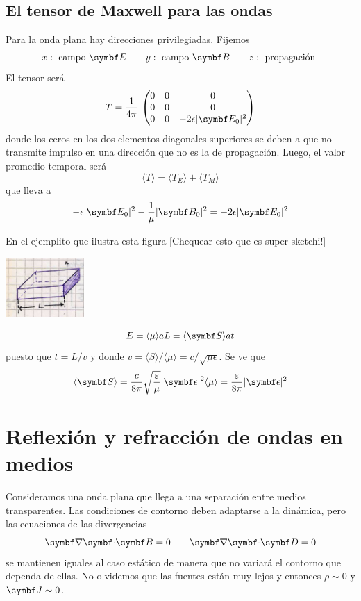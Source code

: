 \documentclass[10pt,oneside]{CBFT_book}
\begin{document}
\subsection{El tensor de Maxwell para las ondas}

Para la onda plana hay direcciones privilegiadas. Fijemos
\[
	x : \text{ campo } \vb{E} \qquad 
	y : \text{ campo } \vb{B} \qquad 
	z : \text{ propagación }
\]
El tensor será
\[
	T = \frac{1}{4\pi} \: \begin{pmatrix}
	        0	& 0 	& 0 \\
		0	& 0	& 0 \\
		0	& 0	& -2\epsilon|\vb{E}_0|^2
	       \end{pmatrix}
\]
donde los ceros en los dos elementos diagonales superiores se deben a que no transmite impulso en una
dirección que no es la de propagación. 
Luego, el valor promedio temporal será
\[
	\langle T \rangle =  \langle T_E \rangle + \langle T_M \rangle
\]
que lleva a
\[
	- \epsilon|\vb{E}_0|^2  - \frac{1}{\mu} |\vb{B}_0|^2 = -2\epsilon|\vb{E}_0|^2
\]

En el ejemplito que ilustra esta figura [Chequear esto que es super sketchi!]

\includegraphics[width=0.225\textwidth]{images/fig_ft1_paraTensorOndasMax.jpg}
	
\[
	E = \langle \mu \rangle a L = \langle \vb{S} \rangle a t
\]
puesto que $t=L/v$ y donde $v = \langle S \rangle / \langle \mu \rangle  = c / \sqrt{\mu \epsilon}$.
Se ve que 
\[
	\langle \vb{S} \rangle =  \frac{c}{8\pi} \sqrt{ \frac{\varepsilon}{\mu} }|\vb{\epsilon}|^2
	\langle \mu \rangle = \frac{\varepsilon}{8\pi}  |\vb{\epsilon}|^2
\]

\section{Reflexión y refracción de ondas en medios}

Consideramos una onda plana que llega a una separación entre medios transparentes.
Las condiciones de contorno deben adaptarse a la dinámica, pero las ecuaciones de las divergencias
\[
	\divem{B} = 0 \qquad \divem{D} = 0
\]
se mantienen iguales al caso estático de manera que no variará el contorno que dependa de ellas.
No olvidemos que las fuentes están muy lejos y entonces $\rho \sim 0$ y $\vb{J} \sim 0$.
\end{document}
